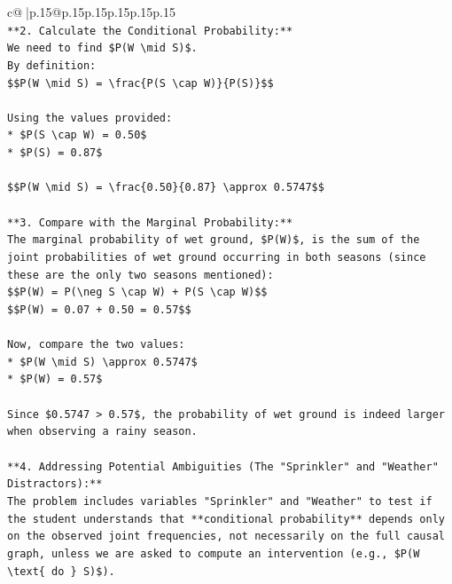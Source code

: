 \documentclass{article}
\begin{document}
{\begin{supertabular}{c@{$\;$}|p{.15\linewidth}@{}p{.15\linewidth}p{.15\linewidth}p{.15\linewidth}p{.15\linewidth}p{.15\linewidth}}
{{{\\ 
\texttt{**2. Calculate the Conditional Probability:**} \\
\texttt{We need to find \$P(W \textbackslash{}mid S)\$.} \\
\texttt{By definition:} \\
\texttt{\$\$P(W \textbackslash{}mid S) = \textbackslash{}frac\{P(S \textbackslash{}cap W)\}\{P(S)\}\$\$} \\
\\ 
\texttt{Using the values provided:} \\
\texttt{*   \$P(S \textbackslash{}cap W) = 0.50\$} \\
\texttt{*   \$P(S) = 0.87\$} \\
\\ 
\texttt{\$\$P(W \textbackslash{}mid S) = \textbackslash{}frac\{0.50\}\{0.87\} \textbackslash{}approx 0.5747\$\$} \\
\\ 
\texttt{**3. Compare with the Marginal Probability:**} \\
\texttt{The marginal probability of wet ground, \$P(W)\$, is the sum of the joint probabilities of wet ground occurring in both seasons (since these are the only two seasons mentioned):} \\
\texttt{\$\$P(W) = P(\textbackslash{}neg S \textbackslash{}cap W) + P(S \textbackslash{}cap W)\$\$} \\
\texttt{\$\$P(W) = 0.07 + 0.50 = 0.57\$\$} \\
\\ 
\texttt{Now, compare the two values:} \\
\texttt{*   \$P(W \textbackslash{}mid S) \textbackslash{}approx 0.5747\$} \\
\texttt{*   \$P(W) = 0.57\$} \\
\\ 
\texttt{Since \$0.5747 > 0.57\$, the probability of wet ground is indeed larger when observing a rainy season.} \\
\\ 
\texttt{**4. Addressing Potential Ambiguities (The "Sprinkler" and "Weather" Distractors):**} \\
\texttt{The problem includes variables "Sprinkler" and "Weather" to test if the student understands that **conditional probability** depends only on the observed joint frequencies, not necessarily on the full causal graph, unless we are asked to compute an intervention (e.g., \$P(W \textbackslash{}text\{ do \} S)\$).} \\
}}}
\end{supertabular}}
\end{document}

